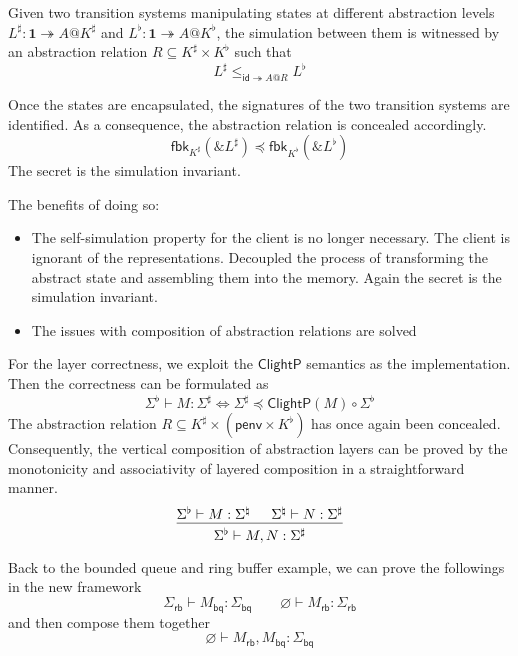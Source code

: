 \documentclass[acmsmall,screen,review,anonymous]{acmart}
\newcommand{\kw}[1]{\ensuremath{ \mathsf{#1} }}
\renewcommand{\preceq}{\preccurlyeq}
\newcommand{\ClightP}{\ensuremath{ \mathsf{ClightP} }}
\begin{document}
Given two transition systems manipulating states
at different abstraction levels
$L^\sharp: \mathbf{1} \twoheadrightarrow A@K^\sharp$
and
$L^\flat: \mathbf{1} \twoheadrightarrow A@K^\flat$,
the simulation between them is witnessed
by an abstraction relation $R \subseteq K^\sharp \times K^\flat$
such that
\[
  L^\sharp \le_{\kw{id} \twoheadrightarrow A@R} L^\flat
\]

Once the states are encapsulated,
the signatures of the two transition systems are identified.
As a consequence, the abstraction relation is concealed accordingly.
\[
  \kw{fbk}_{K^\sharp}(\& L^\sharp) \preceq \kw{fbk}_{K^\flat}(\& L^\flat)
\]
The secret is the simulation invariant.

The benefits of doing so:
\begin{itemize}
\item The self-simulation property for the client is no longer necessary.
  The client is ignorant of the representations.
  Decoupled the process of transforming the abstract state
  and assembling them into the memory.
  Again the secret is the simulation invariant.
\item The issues with composition of abstraction relations are solved
\end{itemize}

For the layer correctness,
we exploit the $\ClightP$ semantics as the implementation.
Then the correctness can be formulated as
\[
  \Sigma^\flat \vdash M : \Sigma^\sharp
  \Leftrightarrow
  \Sigma^\sharp \preceq \ClightP(M) \circ \Sigma^\flat
\]
The abstraction relation
$R \subseteq K^\sharp \times (\kw{penv} \times K^\flat)$
has once again been concealed.
Consequently, the vertical composition of abstraction layers
can be proved
by the monotonicity and associativity of layered composition
in a straightforward manner.
\[
  \begin{prooftree}
    \hypo{\Sigma^\flat \vdash M : \Sigma^\natural}
    \hypo{\Sigma^\natural \vdash N : \Sigma^\sharp}
    \infer2{\Sigma^\flat \vdash M, N : \Sigma^\sharp}
  \end{prooftree}
\]

Back to the bounded queue and ring buffer example,
we can prove the followings in the new framework
\[
  \Sigma_\kw{rb} \vdash M_\kw{bq} : \Sigma_\kw{bq}
  \qquad
  \varnothing \vdash M_\kw{rb} : \Sigma_\kw{rb}
\]
and then compose them together
\[
  \varnothing \vdash M_\kw{rb}, M_\kw{bq} : \Sigma_\kw{bq}
\]
\end{document}
